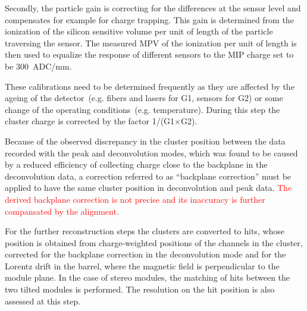 Secondly, the particle gain is correcting for the differences at the sensor level and compensates for example for charge trapping. This gain is determined from the ionization of the silicon sensitive volume per unit of length of the particle traversing the sensor. The measured MPV of the ionization per unit of length is then used to equalize the response of different sensors to the MIP charge set to be 300~ADC/mm. 

These calibrations need to be determined frequently as they are affected by the ageing of the detector~(e.g. fibers and lasers for G1,  sensors for G2) or some change of the operating conditions~(e.g. temperature). During this step the cluster charge is corrected by the factor 1/(G1$\times$G2).

Because of the observed discrepancy in the cluster position between the data recorded with the peak and deconvolution modes, which was found to be caused by a reduced efficiency of collecting charge close to the backplane in the deconvolution data, a correction referred to as ``backplane correction'' must be applied to have the same cluster position in deconvolution and peak data. \textcolor{red}{The derived backplane correction is not precise and its inaccuracy is further compansated by the alignment.}

For the further reconstruction steps the clusters are converted to hits, whose position is obtained from charge-weighted positions of the channels in the cluster, corrected for the backplane correction in the deconvolution mode and for the Lorentz drift in the barrel, where the magnetic field is perpendicular to the module plane. In the case of stereo modules, the matching of hits between the two tilted modules is performed. The resolution on the hit position is also assessed at this step.



